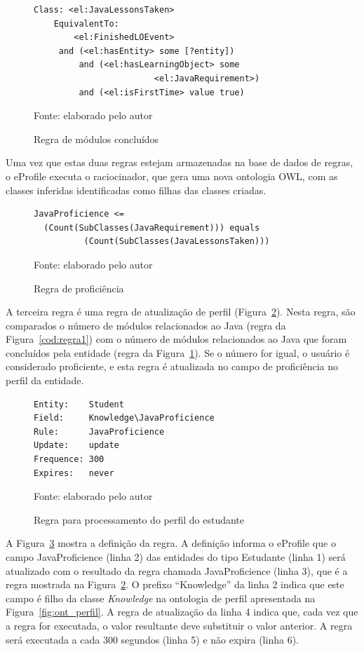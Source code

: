\begin{figure}
\caption{Regra de módulos concluídos}
\begin{lstlisting}
Class: <el:JavaLessonsTaken>
    EquivalentTo: 
        <el:FinishedLOEvent>
	 and (<el:hasEntity> some [?entity])
         and (<el:hasLearningObject> some 
	                    <el:JavaRequirement>)
         and (<el:isFirstTime> value true)
\end{lstlisting}
\label{cod:regra2}

Fonte: elaborado pelo autor
\end{figure}

Uma vez que estas duas regras estejam armazenadas na base de dados de regras, o eProfile executa o raciocinador, que gera uma nova ontologia OWL, com as classes inferidas identificadas como filhas das classes criadas.

\begin{figure}
\caption{Regra de proficiência}
\begin{lstlisting}
JavaProficience <= 
  (Count(SubClasses(JavaRequirement))) equals
          (Count(SubClasses(JavaLessonsTaken)))
\end{lstlisting}
\label{cod:regra3}

Fonte: elaborado pelo autor
\end{figure}

A terceira regra é uma regra de atualização de perfil (Figura~\ref{cod:regra3}). Nesta regra, são comparados o número de módulos relacionados ao Java (regra da Figura~\ref{cod:regra1}) com o número de módulos relacionados ao Java que foram concluídos pela entidade (regra da Figura~\ref{cod:regra2}). Se o número for igual, o usuário é considerado proficiente, e esta regra é atualizada no campo de proficiência no perfil da entidade.

\begin{figure}[!t]
\caption{Regra para processamento do perfil do estudante}
\begin{lstlisting}
Entity:    Student
Field:     Knowledge\JavaProficience
Rule:      JavaProficience
Update:    update
Frequence: 300
Expires:   never
\end{lstlisting}
\label{fig:defregra}

Fonte: elaborado pelo autor
\end{figure}

A Figura~\ref{fig:defregra} mostra a definição da regra. A definição informa o eProfile que o campo JavaProficience (linha 2) das entidades do tipo Estudante (linha 1) será atualizado com o resultado da regra chamada JavaProficience (linha 3), que é a regra mostrada na Figura~\ref{cod:regra3}. O prefixo ``Knowledge'' da linha 2 indica que este campo é filho da classe {\em Knowledge} na ontologia de perfil apresentada na Figura~\ref{fig:ont_perfil}. A regra de atualização da linha 4 indica que, cada vez que a regra for executada, o valor resultante deve substituir o valor anterior. A regra será executada a cada 300 segundos (linha 5) e não expira (linha 6).

